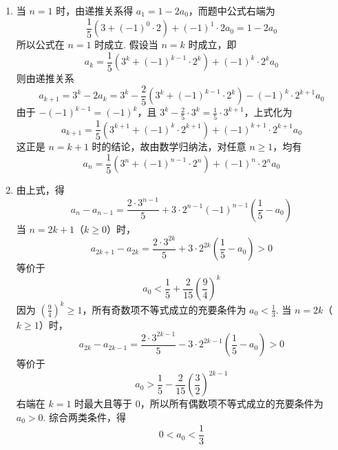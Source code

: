 \begin{solution}
\begin{enumerate}
\item 当 \(n=1\) 时，由递推关系得 \(a_{1}=1-2a_{0}\)，而题中公式右端为
\[
\frac15\left(3+(-1)^{0}\cdot2\right)+(-1)^{1}\cdot2a_{0}=1-2a_{0}
\]
所以公式在 \(n=1\) 时成立. 假设当 \(n=k\) 时成立，即
\[
a_{k}=\frac15\left(3^{k}+(-1)^{k-1}\cdot2^{k}\right)+(-1)^{k}\cdot2^{k}a_{0}
\]
则由递推关系
\[
a_{k+1}=3^{k}-2a_{k}
=3^{k}-\frac25\left(3^{k}+(-1)^{k-1}\cdot2^{k}\right)-(-1)^{k}\cdot2^{k+1}a_{0}
\]
由于 \(-(-1)^{k-1}=(-1)^k\)，且 \(3^k-\frac25\cdot3^k=\frac15\cdot3^{k+1}\)，上式化为
\[
a_{k+1}=\frac15\left(3^{k+1}+(-1)^{k}\cdot2^{k+1}\right)+(-1)^{k+1}\cdot2^{k+1}a_{0}
\]
这正是 \(n=k+1\) 时的结论，故由数学归纳法，对任意 \(n\geqslant1\)，均有
\[
a_{n}=\frac15\left(3^{n}+(-1)^{n-1}\cdot2^{n}\right)+(-1)^{n}\cdot2^{n}a_{0}
\]
\item 由上式，得
\[
a_{n}-a_{n-1}=\frac{2\cdot3^{n-1}}5+3\cdot2^{n-1}(-1)^{n-1}\left(\frac15-a_{0}\right)
\]
当 \(n=2k+1\)（\(k\geqslant0\)）时，
\[
a_{2k+1}-a_{2k}
=\frac{2\cdot3^{2k}}5+3\cdot2^{2k}\left(\frac15-a_{0}\right)>0
\]
等价于
\[
a_{0}<\frac15+\frac{2}{15}\left(\frac94\right)^{k}
\]
因为 \(\left(\frac94\right)^{k}\geqslant1\)，所有奇数项不等式成立的充要条件为 \(a_{0}<\frac13\). 当 \(n=2k\)（\(k\geqslant1\)）时，
\[
a_{2k}-a_{2k-1}
=\frac{2\cdot3^{2k-1}}5-3\cdot2^{2k-1}\left(\frac15-a_{0}\right)>0
\]
等价于
\[
a_{0}>\frac15-\frac{2}{15}\left(\frac32\right)^{2k-1}
\]
右端在 \(k=1\) 时最大且等于 \(0\)，所以所有偶数项不等式成立的充要条件为 \(a_{0}>0\). 综合两类条件，得
\[
0<a_{0}<\frac13
\]
\end{enumerate}
\end{solution}
